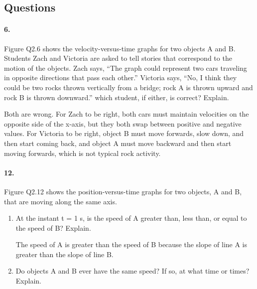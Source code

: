     \begin{multicols*}{2}
        \subsection*{Questions}

        \paragraph*{6.}
        Figure Q2.6 shows the velocity-versus-time graphs for two objects A and B. Students Zach and Victoria are asked to tell stories that correspond to the motion of the objects. Zach says, “The graph could represent two cars traveling in opposite directions that pass each other.” Victoria says, “No, I think they could be two rocks thrown vertically from a bridge; rock A is thrown upward and rock B is thrown downward.” which student, if either, is correct? Explain.

        \begin{mdframed}
            Both are wrong. For Zach to be right, both cars must maintain velocities on the opposite side of the x-axis, but they both swap between positive and negative values. For Victoria to be right, object B must move forwards, slow down, and then start coming back, and object A must move backward and then start moving forwards, which is not typical rock activity.
        \end{mdframed}

        \paragraph*{12.}
        Figure Q2.12 shows the position-versus-time graphs for two objects, A and B, that are moving along the same axis.

        \begin{enumerate}[label={\Alph*.}]
            \item At the instant t = 1 s, is the speed of A greater than, less than, or equal to the speed of B? Explain.
            
                \begin{mdframed}
                    The speed of A is greater than the speed of B because the slope of line A is greater than the slope of line B.
                \end{mdframed}

            \item Do objects A and B ever have the same speed? If so, at what time or times? Explain.
            

\end{enumerate}
\end{multicols*}

